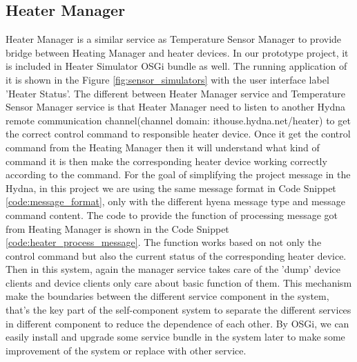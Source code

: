 \subsection{Heater Manager}
\par Heater Manager is a similar service as Temperature Sensor Manager to provide bridge between Heating Manager and heater devices. In our prototype project, it is included in Heater Simulator OSGi bundle as well. The running application of it is shown in the Figure \ref{fig:sensor_simulators} with the user interface label 'Heater Status'. The different between Heater Manager service and Temperature Sensor Manager service is that Heater Manager need to listen to another Hydna  remote communication channel(channel domain: ithouse.hydna.net/heater) to get the correct control command to responsible heater device. Once it get the control command from the Heating Manager then it will understand what kind of command it is then make the corresponding heater device working correctly according to the command. For the goal of simplifying the project message in the Hydna, in this  project we are using the same message format in Code Snippet \ref{code:message_format}, only with the different hyena message type and message command content. The code to provide the function of processing message got from Heating Manager is shown in the Code Snippet \ref{code:heater_process_message}. The function works based on not only the control command but also the current status of the corresponding  heater device. Then in this system, again the manager service takes care of the 'dump' device clients and device clients only care about basic function of them. This mechanism make the boundaries between the different service component in the system, that's the key part of the self-component system to separate the different services in different component to reduce the dependence of each other. By OSGi, we can easily install and upgrade some service bundle in the system later to make some improvement of the system or replace with other service. 

